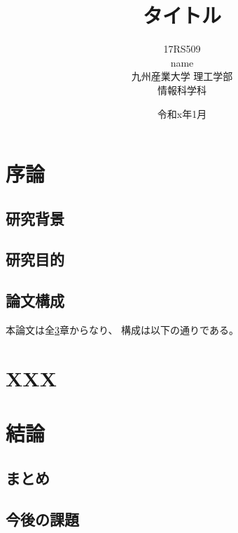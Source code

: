 \documentclass[uplatex,a4paper,12pt]{jsreport}
\title{
 \Huge{タイトル}
 \vspace{3.5cm}\\
}
\author{
 \LARGE{17RS509}\vspace{0.5cm}\\
 \LARGE{name}\vspace{2cm}\\
 \LARGE{九州産業大学 理工学部}\vspace{0.5cm}\\
 \LARGE{情報科学科}\vspace{1cm}\\
}
\date{\LARGE{令和x年1月}}
\begin{document}
\maketitle
\setcounter{page}{0}
\tableofcontents
\listoffigures
\listoftables
\clearpage
\setcounter{page}{0}


\chapter{序論}\label{chap:joron}

\section{研究背景}\label{sec:haikei}
    
\section{研究目的}\label{sec:mokuteki}

\section{論文構成}\label{sec:kousei}

本論文は全\ref{chap:keturon}章からなり、
構成は以下の通りである。


\chapter{XXX}\label{chap:xxx}


\chapter{結論}\label{chap:keturon}

\section{まとめ}\label{sec:matome}
 
\section{今後の課題}\label{sec:kadai}
\end{document}
